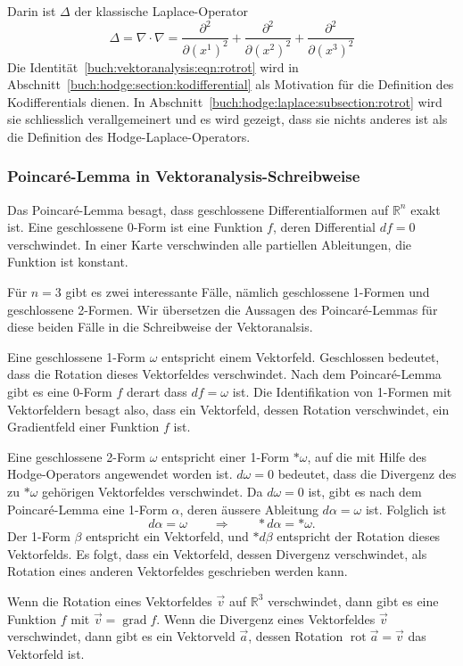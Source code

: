 \egroup
Darin ist $\Delta$ der klassische Laplace-Operator
%
\[
\Delta
=
\nabla\cdot\nabla
=
\frac{\partial^2}{\partial (x^1)^2}
+
\frac{\partial^2}{\partial (x^2)^2}
+
\frac{\partial^2}{\partial (x^3)^2}
\]
Die Identität~\eqref{buch:vektoranalysis:eqn:rotrot} wird in
Abschnitt~\ref{buch:hodge:section:kodifferential} als Motivation
für die Definition des Kodifferentials dienen.
In Abschnitt~\ref{buch:hodge:laplace:subsection:rotrot} wird sie
schliesslich verallgemeinert und es wird gezeigt, dass sie nichts
anderes ist als die Definition des Hodge-Laplace-Operators.

%
%
\subsubsection{Poincaré-Lemma in Vektoranalysis-Schreibweise}
Das Poincaré-Lemma besagt, dass geschlossene Differentialformen auf
$\mathbb{R}^n$ exakt ist.
Eine geschlossene 0-Form ist eine Funktion $f$, deren Differential
$df=0$ verschwindet.
In einer Karte verschwinden alle partiellen Ableitungen, die Funktion
ist konstant.

Für $n=3$ gibt es zwei interessante Fälle, nämlich geschlossene 1-Formen
und geschlossene 2-Formen.
Wir übersetzen die Aussagen des Poincaré-Lemmas für diese beiden
Fälle in die Schreibweise der Vektoranalsis.

Eine geschlossene 1-Form $\omega$ entspricht einem Vektorfeld.
Geschlossen bedeutet, dass die Rotation dieses Vektorfeldes verschwindet.
Nach dem Poincaré-Lemma gibt es eine 0-Form $f$ derart dass
%
$df=\omega$ ist.
Die Identifikation von 1-Formen mit Vektorfeldern besagt also, dass
ein Vektorfeld, dessen Rotation verschwindet, ein Gradientfeld
einer Funktion $f$ ist.

Eine geschlossene 2-Form $\omega$ entspricht einer 1-Form $\ast\omega$,
auf die mit Hilfe des Hodge-Operators angewendet worden ist.
$d\omega=0$ bedeutet, dass die Divergenz des zu $\ast\omega$
gehörigen Vektorfeldes verschwindet.
Da $d\omega=0$ ist, gibt es nach dem Poincaré-Lemma eine 1-Form $\alpha$,
deren äussere Ableitung $d\alpha=\omega$ ist.
Folglich ist 
\[
d\alpha = \omega
\qquad\Rightarrow\qquad
\ast d\alpha = \ast\omega.
\]
Der 1-Form $\beta$ entspricht ein Vektorfeld, und $\ast d\beta$ entspricht
der Rotation dieses Vektorfelds.
Es folgt, dass ein Vektorfeld, dessen Divergenz verschwindet, als
Rotation eines anderen Vektorfeldes geschrieben werden kann.

\begin{satz}
Wenn die Rotation eines Vektorfeldes $\vec{v}$ auf $\mathbb{R}^3$
verschwindet, dann gibt es eine Funktion $f$ mit
$\vec{v}=\operatorname{grad}f$.
Wenn die Divergenz eines Vektorfeldes $\vec{v}$ verschwindet,
dann gibt es ein Vektorveld $\vec{a}$, dessen Rotation
$\operatorname{rot}\vec{a}=\vec{v}$ das Vektorfeld ist.
\end{satz}

